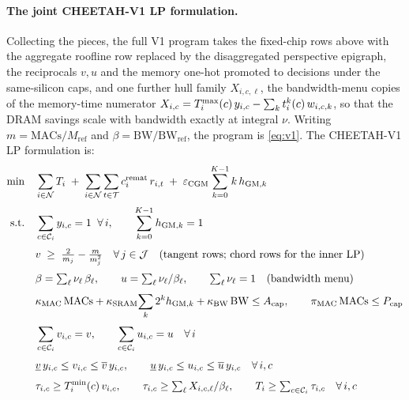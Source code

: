 \paragraph{The joint CHEETAH-V1 LP formulation.}
Collecting the pieces, the full V1 program takes the fixed-chip rows above with the aggregate
roofline row replaced by the disaggregated perspective epigraph, the reciprocals
$v,u$ and the memory one-hot promoted to decisions under the same-silicon caps,
and one further hull family $X_{i,c,\ell}$, the bandwidth-menu copies of the
memory-time numerator $X_{i,c}=T^{\max}_i(c)\,y_{i,c}-\sum_k t_i^k(c)\,w_{i,c,k}$,
so that the DRAM savings scale with bandwidth exactly at integral $\nu$. Writing $m = \mathrm{MACs}/M_{\mathrm{ref}}$ and
$\beta = \mathrm{BW}/\mathrm{BW_{ref}}$, the program is \eqref{eq:v1}.
The CHEETAH-V1 LP formulation is:
\begin{equation}
\begin{aligned}
\min \quad & \sum_{i \in \mathcal{N}} T_i \;+\;
             \sum_{i \in \mathcal{N}} \sum_{t \in \mathcal{T}} c_i^{\text{remat}}\, r_{i,t}
             \;+\; \varepsilon_{\mathrm{CGM}} \sum_{k=0}^{K-1} k \, h_{\mathrm{GM},k} \\[3pt]
\text{s.t.} \quad
& \sum_{c \in \mathcal{C}_i} y_{i,c} = 1 \;\;\forall\, i, \qquad
  \sum_{k=0}^{K-1} h_{\mathrm{GM},k} = 1 \\[3pt]
& v \;\geq\; \tfrac{2}{m_j} - \tfrac{m}{m_j^{2}} \quad \forall\, j \in \mathcal{J}
  \quad\text{(tangent rows; chord rows for the inner LP)} \\[3pt]
& \beta = \textstyle\sum_{\ell} \nu_\ell\, \beta_\ell, \qquad
  u = \textstyle\sum_{\ell} \nu_\ell/\beta_\ell, \qquad
  \textstyle\sum_{\ell} \nu_\ell = 1 \quad\text{(bandwidth menu)} \\[3pt]
& \kappa_{\mathrm{MAC}}\,\mathrm{MACs} + \kappa_{\mathrm{SRAM}}\!\sum_{k} 2^{k} h_{\mathrm{GM},k}
  + \kappa_{\mathrm{BW}}\,\mathrm{BW} \leq A_{\mathrm{cap}}, \qquad
  \pi_{\mathrm{MAC}}\,\mathrm{MACs} \leq P_{\mathrm{cap}} \\[3pt]
& \sum_{c \in \mathcal{C}_i} v_{i,c} = v, \qquad \sum_{c \in \mathcal{C}_i} u_{i,c} = u
  \quad \forall\, i \\[3pt]
& \underline v\, y_{i,c} \leq v_{i,c} \leq \overline v\, y_{i,c}, \qquad
  \underline u\, y_{i,c} \leq u_{i,c} \leq \overline u\, y_{i,c}
  \quad \forall\, i, c \\[3pt]
& \tau_{i,c} \geq \Tmin_i(c)\, v_{i,c}, \qquad
  \tau_{i,c} \geq \textstyle\sum_{\ell} X_{i,c,\ell}/\beta_\ell, \qquad
  T_i \geq \sum_{c \in \mathcal{C}_i} \tau_{i,c} \quad \forall\, i, c \\[3pt]

\end{aligned}
\end{equation}
